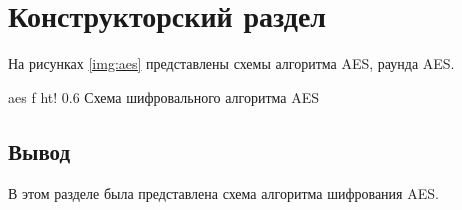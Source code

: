 \chapter{Конструкторский раздел}

На рисунках \ref{img:aes} представлены схемы алгоритма AES, раунда AES.

{aes} %
{f} %
{ht!} %
{0.6\textwidth} %
{Схема шифровального алгоритма AES} %


\section*{Вывод}

В этом разделе была представлена схема алгоритма шифрования AES.




